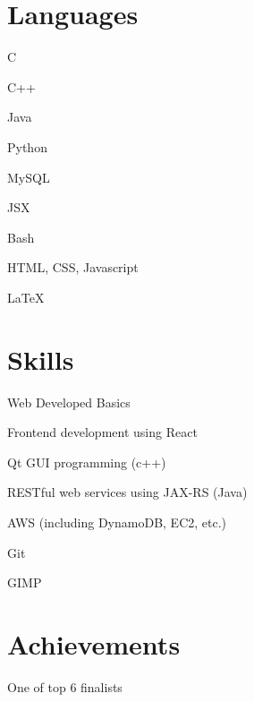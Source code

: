 \documentclass[]{deedy-resume-openfont}
\begin{document}
\begin{minipage}[t]{0.33\textwidth} 

\section{Languages} 
\hspace{0.5em}
\begin{tightemize}
\item C
\item C++
\item Java
\item Python
\end{tightemize}
\sectionsep
{}
\begin{tightemize}
\item MySQL
\item JSX
\item Bash
\item HTML, CSS, Javascript
\item \LaTeX
\end{tightemize}
\sectionsep

\section{Skills} 
\sectionsep
\begin{tightemize}
\item Web Developed Basics
\item Frontend development using React
\item Qt GUI programming (c++)
\item RESTful web services using JAX-RS (Java)
\item AWS (including DynamoDB, EC2, etc.)
\item Git
\item GIMP
\end{tightemize}
\sectionsep



\section{Achievements}
\sectionsep
\begin{tightemize}

\item {}
One of top 6 finalists

\item {}


\end{tightemize}
\end{minipage}
\end{document}
